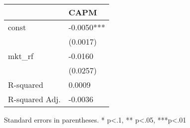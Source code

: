 \begin{table}
\caption{}
\label{}
\begin{center}
\begin{tabular}{ll}
\hline
               & CAPM        \\
\hline
const          & -0.0050***  \\
               & (0.0017)    \\
mkt\_rf        & -0.0160     \\
               & (0.0257)    \\
R-squared      & 0.0009      \\
R-squared Adj. & -0.0036     \\
\hline
\end{tabular}
\end{center}
\end{table}
\bigskip
Standard errors in parentheses. \newline 
* p<.1, ** p<.05, ***p<.01